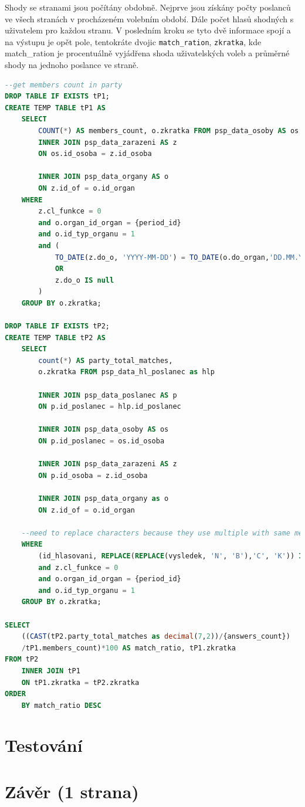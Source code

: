\par Shody se stranami jsou počítány obdobně. Nejprve jsou získány počty poslanců ve všech stranách v procházeném volebním období. Dále počet hlasů shodných s uživatelem pro každou stranu. V posledním kroku se tyto dvě informace spojí a na výstupu je opět pole, tentokráte dvojic \texttt{match\_ration}, \texttt{zkratka}, kde match\_ration je procentuálně vyjádřena shoda uživatelských voleb a průměrné shody na jednoho poslance ve straně.

\begin{lstlisting}[language=SQL, caption={SQL dotaz na vyhledání shod uživatele se stranami}, label=code:sql-shoda-strany]
--get members count in party
DROP TABLE IF EXISTS tP1;
CREATE TEMP TABLE tP1 AS
    SELECT 
        COUNT(*) AS members_count, o.zkratka FROM psp_data_osoby AS os
        INNER JOIN psp_data_zarazeni AS z 
        ON os.id_osoba = z.id_osoba

        INNER JOIN psp_data_organy AS o
        ON z.id_of = o.id_organ
    WHERE 
        z.cl_funkce = 0
        and o.organ_id_organ = {period_id}
        and o.id_typ_organu = 1
        and (
            TO_DATE(z.do_o, 'YYYY-MM-DD') = TO_DATE(o.do_organ,'DD.MM.YYYY')
            OR 
            z.do_o IS null
        )
    GROUP BY o.zkratka;

DROP TABLE IF EXISTS tP2;
CREATE TEMP TABLE tP2 AS
    SELECT 
        count(*) AS party_total_matches, 
        o.zkratka FROM psp_data_hl_poslanec as hlp
        
        INNER JOIN psp_data_poslanec AS p
        ON p.id_poslanec = hlp.id_poslanec

        INNER JOIN psp_data_osoby AS os
        ON p.id_poslanec = os.id_osoba

        INNER JOIN psp_data_zarazeni AS z 
        ON p.id_osoba = z.id_osoba

        INNER JOIN psp_data_organy as o
        ON z.id_of = o.id_organ

    --need to replace characters because they use multiple with same meaning
    WHERE 
        (id_hlasovani, REPLACE(REPLACE(vysledek, 'N', 'B'),'C', 'K')) IN %s
        and z.cl_funkce = 0
        and o.organ_id_organ = {period_id}
        and o.id_typ_organu = 1
    GROUP BY o.zkratka;

SELECT 
    ((CAST(tP2.party_total_matches as decimal(7,2))/{answers_count})
    /tP1.members_count)*100 AS match_ratio, tP1.zkratka 
FROM tP2
    INNER JOIN tP1
    ON tP1.zkratka = tP2.zkratka
ORDER 
    BY match_ratio DESC
\end{lstlisting}

\chapter{Testování}
\label{chap:testovani}




\chapter{Závěr (1 strana)}
\label{chap:zaver}